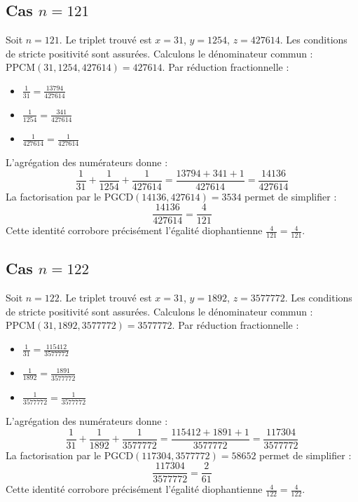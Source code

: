 \documentclass[11pt,a4paper]{article}
\begin{document}
\subsection{Cas $n = 121$}
Soit $n = 121$. Le triplet trouvé est $x = 31$, $y = 1254$, $z = 427614$.
Les conditions de stricte positivité sont assurées.
Calculons le dénominateur commun : $\text{PPCM}(31, 1254, 427614) = 427614$.
Par réduction fractionnelle :
\begin{itemize}
    \item $\frac{1}{31} = \frac{13794}{427614}$
    \item $\frac{1}{1254} = \frac{341}{427614}$
    \item $\frac{1}{427614} = \frac{1}{427614}$
\end{itemize}
L'agrégation des numérateurs donne :
$$ \frac{1}{31} + \frac{1}{1254} + \frac{1}{427614} = \frac{13794 + 341 + 1}{427614} = \frac{14136}{427614} $$
La factorisation par le $\text{PGCD}(14136, 427614) = 3534$ permet de simplifier :
$$ \frac{14136}{427614} = \frac{4}{121} $$
Cette identité corrobore précisément l'égalité diophantienne $\frac{4}{121} = \frac{4}{121}$.

\subsection{Cas $n = 122$}
Soit $n = 122$. Le triplet trouvé est $x = 31$, $y = 1892$, $z = 3577772$.
Les conditions de stricte positivité sont assurées.
Calculons le dénominateur commun : $\text{PPCM}(31, 1892, 3577772) = 3577772$.
Par réduction fractionnelle :
\begin{itemize}
    \item $\frac{1}{31} = \frac{115412}{3577772}$
    \item $\frac{1}{1892} = \frac{1891}{3577772}$
    \item $\frac{1}{3577772} = \frac{1}{3577772}$
\end{itemize}
L'agrégation des numérateurs donne :
$$ \frac{1}{31} + \frac{1}{1892} + \frac{1}{3577772} = \frac{115412 + 1891 + 1}{3577772} = \frac{117304}{3577772} $$
La factorisation par le $\text{PGCD}(117304, 3577772) = 58652$ permet de simplifier :
$$ \frac{117304}{3577772} = \frac{2}{61} $$
Cette identité corrobore précisément l'égalité diophantienne $\frac{4}{122} = \frac{4}{122}$.
\end{document}
